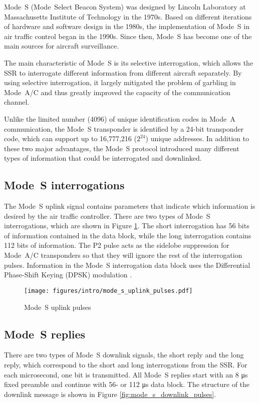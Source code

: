 Mode~S (Mode~Select Beacon System) was designed by Lincoln Laboratory at Massachusetts Institute of Technology in the 1970s. Based on different iterations of hardware and software design in the 1980s, the implementation of Mode~S in air traffic control began in the 1990s. Since then, Mode~S has become one of the main sources for aircraft surveillance.

The main characteristic of Mode~S is its selective interrogation, which allows the SSR to interrogate different information from different aircraft separately. By using selective interrogation, it largely mitigated the problem of garbling in Mode~A/C and thus greatly improved the capacity of the communication channel.

Unlike the limited number (4096) of unique identification codes in Mode~A communication, the Mode~S transponder is identified by a 24-bit transponder code, which can support up to 16,777,216 ($2^{24}$) unique addresses. In addition to these two major advantages, the Mode~S protocol introduced many different types of information that could be interrogated and downlinked.

\subsection{Mode~S interrogations}
The Mode~S uplink signal contains parameters that indicate which information is desired by the air traffic controller. There are two types of Mode~S interrogations, which are shown in Figure \ref{fig:mode_s_uplink_pulses}. The short interrogation has 56 bits of information contained in the data block, while the long interrogation contains 112 bits of information. The P2 pulse acts as the sidelobe suppression for Mode~A/C transponders so that they will ignore the rest of the interrogation pulses. Information in the Mode~S interrogation data block uses the Differential Phase-Shift Keying (DPSK) modulation \cite{mazda2014}.

\begin{figure}[ht]
  \texttt{[image: figures/intro/mode\_s\_uplink\_pulses.pdf]}
  \caption{Mode~S uplink pulses}
  \label{fig:mode_s_uplink_pulses}
\end{figure}


\subsection{Mode~S replies}
There are two types of Mode~S downlink signals, the short reply and the long reply, which correspond to the short and long interrogations from the SSR. For each microsecond, one bit is transmitted. All Mode~S replies start with an 8 μs fixed preamble and continue with 56- or 112 μs data block. The structure of the downlink message is shown in Figure \ref{fig:mode_s_downlink_pulses}.

